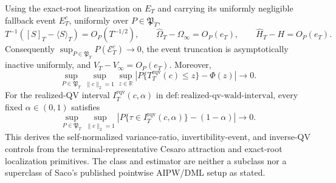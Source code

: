 Using the exact-root linearization on \(E_T\) and carrying its uniformly negligible fallback event \(E_T^c\), uniformly over \(P\in\mathfrak P_T\),
\[
 T^{-1}([S]_T-\langle S\rangle_T)=O_P(T^{-1/2}),\qquad
 \widehat\Omega_T-\Omega_\infty=O_P(e_T),\qquad
 \widehat H_T-H=O_P(e_T).
\]
Consequently \(\sup_{P\in\mathfrak P_T}P(\mathcal E_T^c)\to0\), the event truncation is asymptotically inactive uniformly, and \(\widehat V_T-V_\infty=O_P(e_T)\). Moreover,
\[
 \sup_{P\in\mathfrak P_T}\sup_{\|c\|_2=1}\sup_{z\in\mathbb R}
 \left|P\{T_T^{\mathrm{rqv}}(c)\le z\}-\Phi(z)\right|\longrightarrow0.
\]
For the realized-QV interval \(I_T^{\mathrm{rqv}}(c,\alpha)\) in \(\mathrm{def:realized\text{-}qv\text{-}wald\text{-}interval}\), every fixed \(\alpha\in(0,1)\) satisfies
\[
 \sup_{P\in\mathfrak P_T}\sup_{\|c\|_2=1}
 \left|P\{\tau\in I_T^{\mathrm{rqv}}(c,\alpha)\}-(1-\alpha)\right|\longrightarrow0.
\]
This derives the self-normalized variance-ratio, invertibility-event, and inverse-QV controls from the terminal-representative Cesaro attraction and exact-root localization primitives. The class and estimator are neither a subclass nor a superclass of Saco's published pointwise AIPW/DML setup as stated.